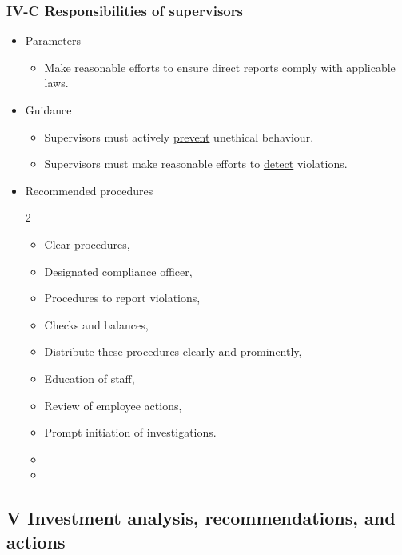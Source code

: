 \documentclass[../notes_compiled.tex]{subfiles}
\begin{document}
\subsubsection{IV-C Responsibilities of supervisors}
\begin{itemize}
\item Parameters
\begin{itemize}
\item Make reasonable efforts to ensure direct reports comply with applicable laws.
\end{itemize}
\item Guidance
\begin{itemize}
\item Supervisors must actively \underline{prevent} unethical behaviour.
\item Supervisors must make reasonable efforts to \underline{detect} violations.
\end{itemize}
\item Recommended procedures
\begin{multicols}{2}
\begin{itemize}
\item Clear procedures,
\item Designated compliance officer,
\item Procedures to report violations,
\item Checks and balances,
\item Distribute these procedures clearly and prominently,
\item Education of staff,
\item Review of employee actions,
\item Prompt initiation of investigations.
\item[]
\item[]
\end{itemize}
\end{multicols}
\end{itemize}
\subsection{V Investment analysis, recommendations, and actions}
\end{document}
